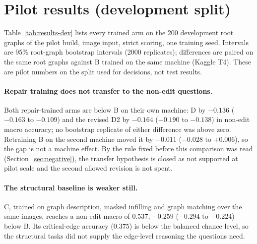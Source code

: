 \section{Pilot results (development split)}
\label{sec:results}

Table~\ref{tab:results-dev} lists every trained arm on the 200 development root graphs of the
pilot build, image input, strict scoring, one training seed. Intervals are 95\% root-graph
bootstrap intervals (2000 replicates); differences are paired on the same root graphs against
B trained on the same machine (Kaggle T4). These are pilot numbers on the split used for
decisions, not test results.

\begin{table}[t]
\centering\small

\caption{Development-split accuracy (pilot build, 200 root graphs, one seed). Reach.\ =
reachability, Crit.\ edge = critical edge; the non-edit macro averages these two. The last
column is the paired difference in non-edit macro accuracy to B\_kaggle with its 95\% interval.
The suffix names the machine the arm was trained on.}
\label{tab:results-dev}
\end{table}

\paragraph{Repair training does not transfer to the non-edit questions.}
Both repair-trained arms are below B on their own machine: D by $-0.136$
($-0.163$ to $-0.109$) and the revised D2 by $-0.164$ ($-0.190$ to $-0.138$) in non-edit
macro accuracy; no bootstrap replicate of either difference was above zero. Retraining B on the
second machine moved it by $-0.011$ ($-0.028$ to $+0.006$), so the gap is not a machine effect.
By the rule fixed before this comparison was read (Section~\ref{sec:negative}), the transfer
hypothesis is closed as not supported at pilot scale and the second allowed revision is not spent.

\paragraph{The structural baseline is weaker still.}
C, trained on graph description, masked infilling and graph matching over the same images, reaches
a non-edit macro of $0.537$, $-0.259$ ($-0.294$ to $-0.224$) below B. Its critical-edge
accuracy ($0.375$) is below the balanced chance level, so the structural tasks did not supply
the edge-level reasoning the questions need.

